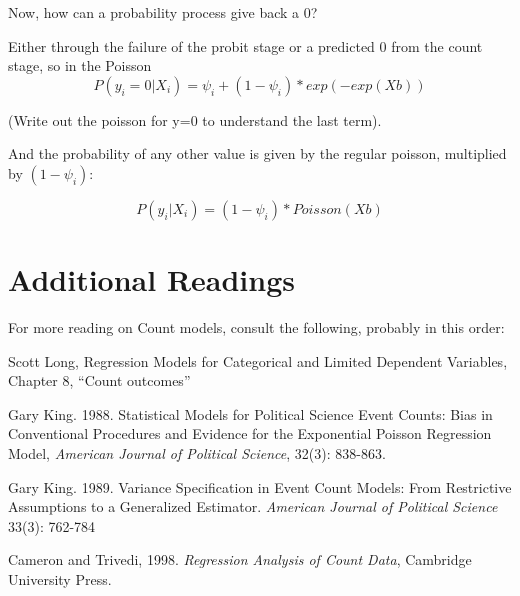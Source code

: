 \documentclass[10pt,english]{beamer}
\def\lyxframeend{} %
\begin{document}
Now, how can a probability process give back a 0?

Either through the failure of the probit stage or a predicted 0 from
the count stage, so in the Poisson 
\[
P(y_{i}=0|X_{i})=\psi_{i}+(1-\psi_{i})*exp(-exp(Xb))
\]


(Write out the poisson for y=0 to understand the last term).

And the probability of any other value is given by the regular poisson,
multiplied by $(1-\psi_{i}):$

\[
P(y_{i}|X_{i})=(1-\psi_{i})*Poisson(Xb)
\]



\lyxframeend{}\section{Additional Readings}

For more reading on Count models, consult the following, probably
in this order:

Scott Long, Regression Models for Categorical and Limited Dependent
Variables, Chapter 8, ``Count outcomes''

Gary King. 1988. Statistical Models for Political Science Event Counts:
Bias in Conventional Procedures and Evidence for the Exponential Poisson
Regression Model, \emph{American Journal of Political Science}, 32(3):
838-863.

Gary King. 1989. Variance Specification in Event Count Models: From
Restrictive Assumptions to a Generalized Estimator. \emph{American
Journal of Political Science} 33(3): 762-784

Cameron and Trivedi, 1998. \emph{Regression Analysis of Count Data},
Cambridge University Press.


\lyxframeend{}
\end{document}
